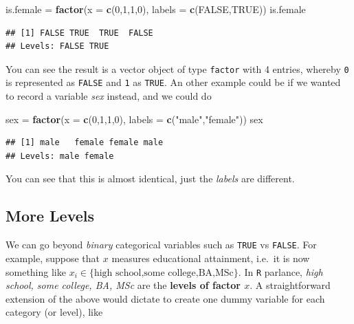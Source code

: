 \documentclass[]{book}
\newenvironment{Shaded}{\begin{snugshade}}{\end{snugshade}}
\newcommand{\KeywordTok}[1]{\textcolor[rgb]{0.13,0.29,0.53}{\textbf{#1}}}
\newcommand{\DataTypeTok}[1]{\textcolor[rgb]{0.13,0.29,0.53}{#1}}
\newcommand{\DecValTok}[1]{\textcolor[rgb]{0.00,0.00,0.81}{#1}}
\newcommand{\StringTok}[1]{\textcolor[rgb]{0.31,0.60,0.02}{#1}}
\newcommand{\OtherTok}[1]{\textcolor[rgb]{0.56,0.35,0.01}{#1}}
\newcommand{\NormalTok}[1]{#1}
\begin{document}
\begin{Shaded}
\begin{Highlighting}[]
\NormalTok{is.female =}\StringTok{ }\KeywordTok{factor}\NormalTok{(}\DataTypeTok{x =} \KeywordTok{c}\NormalTok{(}\DecValTok{0}\NormalTok{,}\DecValTok{1}\NormalTok{,}\DecValTok{1}\NormalTok{,}\DecValTok{0}\NormalTok{), }\DataTypeTok{labels =} \KeywordTok{c}\NormalTok{(}\OtherTok{FALSE}\NormalTok{,}\OtherTok{TRUE}\NormalTok{))}
\NormalTok{is.female}
\end{Highlighting}
\end{Shaded}

\begin{verbatim}
## [1] FALSE TRUE  TRUE  FALSE
## Levels: FALSE TRUE
\end{verbatim}

You can see the result is a vector object of type \texttt{factor} with 4
entries, whereby \texttt{0} is represented as \texttt{FALSE} and
\texttt{1} as \texttt{TRUE}. An other example could be if we wanted to
record a variable \emph{sex} instead, and we could do

\begin{Shaded}
\begin{Highlighting}[]
\NormalTok{sex =}\StringTok{ }\KeywordTok{factor}\NormalTok{(}\DataTypeTok{x =} \KeywordTok{c}\NormalTok{(}\DecValTok{0}\NormalTok{,}\DecValTok{1}\NormalTok{,}\DecValTok{1}\NormalTok{,}\DecValTok{0}\NormalTok{), }\DataTypeTok{labels =} \KeywordTok{c}\NormalTok{(}\StringTok{"male"}\NormalTok{,}\StringTok{"female"}\NormalTok{))}
\NormalTok{sex}
\end{Highlighting}
\end{Shaded}

\begin{verbatim}
## [1] male   female female male  
## Levels: male female
\end{verbatim}

You can see that this is almost identical, just the \emph{labels} are
different.

\subsection{More Levels}\label{more-levels}

We can go beyond \emph{binary} categorical variables such as
\texttt{TRUE} vs \texttt{FALSE}. For example, suppose that \(x\)
measures educational attainment, i.e.~it is now something like
\(x_i \in \{\text{high school,some college,BA,MSc}\}\). In \texttt{R}
parlance, \emph{high school, some college, BA, MSc} are the
\textbf{levels of factor \(x\)}. A straightforward extension of the
above would dictate to create one dummy variable for each category (or
level), like
\end{document}
